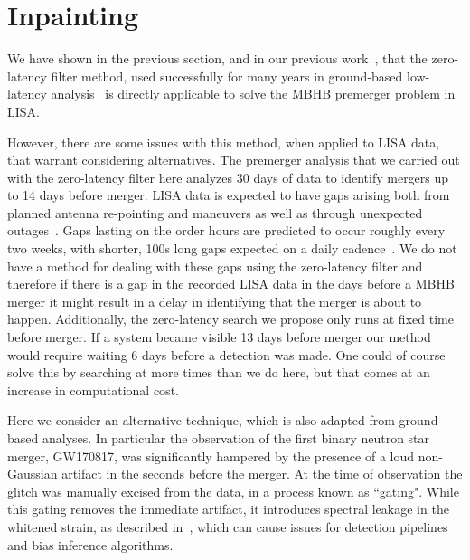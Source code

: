\section{Inpainting}
\label{sec:inpainting}

We have shown in the previous section, and in our previous work~\cite{CabournDavies:2024hea}, that the zero-latency filter method, used successfully for many years in ground-based low-latency analysis~\cite{Tsukada:2017cuf} is directly applicable to
solve the \ac{MBHB} premerger problem in LISA.

However, there are some issues with this method, when applied to LISA data, that warrant considering alternatives.
The premerger analysis that we carried out with the zero-latency filter here analyzes 30 days of data to identify mergers up to 14 days before merger.
LISA data is expected to have gaps arising both from planned antenna re-pointing and maneuvers as well as through unexpected outages~\cite{Colpi:2024xhw}.
Gaps lasting on the order hours are predicted to occur roughly every two weeks, with shorter, 100s long gaps expected on a daily cadence~\cite{Castelli:2024sdb}.
We do not have a method for dealing with these gaps using the zero-latency filter and therefore if there is a gap in the recorded LISA data in the days before a \ac{MBHB} merger it might result in a delay in identifying that the merger is about to happen.
Additionally, the zero-latency search we propose only runs at fixed time before merger. If a system became visible 13 days before merger our method would require waiting 6 days before a detection was made.
One could of course solve this by searching at more times than we do here, but that comes at an increase in computational cost.

Here we consider an alternative technique, which is also adapted from ground-based analyses.
In particular the observation of the first binary neutron star merger, GW170817, was significantly hampered by the presence of a loud non-Gaussian artifact in the seconds before the merger.
At the time of observation the glitch was manually excised from the data, in a process known as ``gating".
While this gating removes the immediate artifact, it introduces spectral leakage in the whitened strain, as described in~\cite{Zackay:2019kkv}, which can cause issues for detection pipelines and bias inference algorithms.

